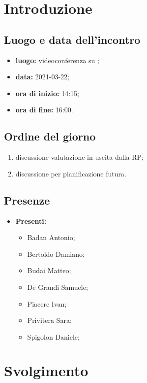 \section*{Introduzione}
\subsection*{Luogo e data dell'incontro}
\begin{itemize}
	\item \textbf{luogo:} videoconferenza su ;
	\item \textbf{data:} 2021-03-22;
	\item \textbf{ora di inizio:} 14:15;
	\item \textbf{ora di fine:} 16:00.
\end{itemize}

\subsection*{Ordine del giorno}
\begin{enumerate}
	\item discussione valutazione in uscita dalla RP;
	\item discussione per pianificazione futura.
		
\end{enumerate}

\subsection*{Presenze}
\begin{itemize}
	\item \textbf{Presenti: }
	\begin{itemize}
		\item Badan Antonio;
		\item Bertoldo Damiano;
		\item Budai Matteo;
		\item De Grandi Samuele;
		\item Piacere Ivan;
		\item Privitera Sara;
		\item Spigolon Daniele;
	\end{itemize}
\end{itemize}


\section*{Svolgimento}

